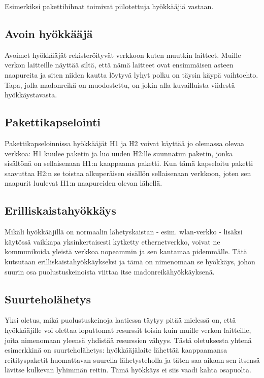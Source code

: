\documentclass[finnish]{tktltiki2}
\theoremstyle{definition}
\theoremstyle{remark}
\begin{document}
Esimerkiksi pakettihihnat toimivat piilotettuja hyökkääjiä vastaan.

\subsection{Avoin hyökkääjä}

Avoimet hyökkääjät rekisteröityvät verkkoon kuten muutkin laitteet. Muille verkon laitteille näyttää siltä, että nämä laitteet ovat ensimmäisen asteen naapureita ja siten niiden kautta löytyvä lyhyt polku on täysin käypä vaihtoehto. Tapa, jolla madonreikä on muodostettu, on jokin alla kuvailluista viidestä hyökkäystavasta.

\subsection{Pakettikapselointi}

Pakettikapseloinnissa hyökkääjät H1 ja H2 voivat käyttää jo olemassa olevaa verkkoa: H1 kuulee paketin ja luo uuden H2:lle suunnatun paketin, jonka sisältönä on sellaisenaan H1:n kaappaama paketti. Kun tämä kapseloitu paketti saavuttaa H2:n se toistaa alkuperäisen sisällön sellaisenaan verkkoon, joten sen naapurit luulevat H1:n naapureiden olevan lähellä.

\subsection{Erilliskaistahyökkäys}

Mikäli hyökkääjillä on normaalin lähetyskaistan - esim. wlan-verkko - lisäksi käytössä vaikkapa yksinkertaisesti kytketty ethernetverkko, voivat ne kommunikoida yleistä verkkoa nopeammin ja sen kantamaa pidemmälle. Tätä kutsutaan erilliskaistahyökkäykseksi ja tämä on nimenomaan se hyökkäys, johon suurin osa puolustuskeinoista viittaa itse madonreikähyökkäyksenä.

\subsection{Suurteholähetys}

Yksi oletus, mikä puolustuskeinoja laatiessa täytyy pitää mielessä on, että hyökkääjille voi olettaa loputtomat resurssit toisin kuin muille verkon laitteille, joita nimenomaan yleensä yhdistää resurssien vähyys. Tästä oletuksesta yhtenä esimerkkinä on suurteholähetys: hyökkääjälaite lähettää kaappaamansa reitityspaketit huomattavan suurella lähetysteholla ja täten saa aikaan sen itsensä lävitse kulkevan lyhimmän reitin. Tämä hyökkäys ei siis vaadi kahta osapuolta. 
\end{document}
